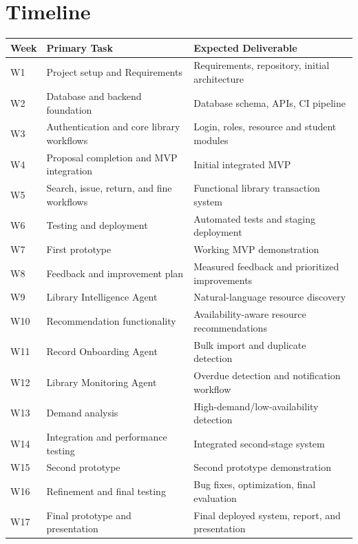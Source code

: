 \documentclass[11pt]{article}
\begin{document}
\section{Timeline}
\begin{table}[H]
\centering
\begin{tabular}{|l|p{5cm}|p{7cm}|}
\hline
\textbf{Week} & \textbf{Primary Task} & \textbf{Expected Deliverable} \\ \hline
W1 & Project setup and Requirements & Requirements, repository, initial architecture \\ \hline
W2 & Database and backend foundation & Database schema, APIs, CI pipeline \\ \hline
W3 & Authentication and core library workflows & Login, roles, resource and student modules \\ \hline
W4 & Proposal completion and MVP integration & Initial integrated MVP \\ \hline
W5 & Search, issue, return, and fine workflows & Functional library transaction system \\ \hline
W6 & Testing and deployment & Automated tests and staging deployment \\ \hline
W7 & First prototype & Working MVP demonstration \\ \hline
W8 & Feedback and improvement plan & Measured feedback and prioritized improvements \\ \hline
W9 & Library Intelligence Agent & Natural-language resource discovery \\ \hline
W10 & Recommendation functionality & Availability-aware resource recommendations \\ \hline
W11 & Record Onboarding Agent & Bulk import and duplicate detection \\ \hline
W12 & Library Monitoring Agent & Overdue detection and notification workflow \\ \hline
W13 & Demand analysis & High-demand/low-availability detection \\ \hline
W14 & Integration and performance testing & Integrated second-stage system \\ \hline
W15 & Second prototype & Second prototype demonstration \\ \hline
W16 & Refinement and final testing & Bug fixes, optimization, final evaluation \\ \hline
W17 & Final prototype and presentation & Final deployed system, report, and presentation \\ \hline
\end{tabular}
\end{table}
\end{document}
